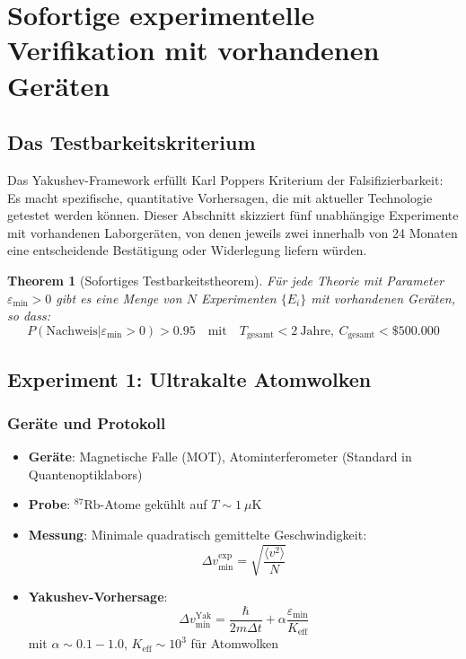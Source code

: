 \documentclass[11pt,a4paper]{article}
\newtheorem{theorem}{Theorem}
\begin{document}
	\section{Sofortige experimentelle Verifikation mit vorhandenen Geräten}
	\label{sec:immediate-verification}
	
	\subsection{Das Testbarkeitskriterium}
	
	Das Yakushev-Framework erfüllt Karl Poppers Kriterium der Falsifizierbarkeit: Es macht spezifische, quantitative Vorhersagen, die mit aktueller Technologie getestet werden können. Dieser Abschnitt skizziert fünf unabhängige Experimente mit vorhandenen Laborgeräten, von denen jeweils zwei innerhalb von 24 Monaten eine entscheidende Bestätigung oder Widerlegung liefern würden.
	
	\begin{theorem}[Sofortiges Testbarkeitstheorem]
		Für jede Theorie mit Parameter $\varepsilon_{\min} > 0$ gibt es eine Menge von $N$ Experimenten $\{E_i\}$ mit vorhandenen Geräten, so dass:
		\begin{equation}
			\boxed{P(\text{Nachweis}|\varepsilon_{\min} > 0) > 0.95 \quad \text{mit} \quad T_{\text{gesamt}} < 2\ \text{Jahre}, \ C_{\text{gesamt}} < \$500.000}
		\end{equation}
	\end{theorem}
	
	\subsection{Experiment 1: Ultrakalte Atomwolken}
	
	\subsubsection{Geräte und Protokoll}
	
	\begin{itemize}
		\item \textbf{Geräte}: Magnetische Falle (MOT), Atominterferometer (Standard in Quantenoptiklabors)
		\item \textbf{Probe}: $^{87}\text{Rb}$-Atome gekühlt auf $T \sim 1\ \mu\text{K}$
		\item \textbf{Messung}: Minimale quadratisch gemittelte Geschwindigkeit:
		\[
		\Delta v_{\min}^{\text{exp}} = \sqrt{\frac{\langle v^2 \rangle}{N}}
		\]
		\item \textbf{Yakushev-Vorhersage}:
		\[
		\Delta v_{\min}^{\text{Yak}} = \frac{\hbar}{2m\Delta t} + \alpha \frac{\varepsilon_{\min}}{K_{\mathrm{eff}}}
		\]
		mit $\alpha \sim 0.1-1.0$, $K_{\mathrm{eff}} \sim 10^3$ für Atomwolken
	\end{itemize}
	
\end{document}
